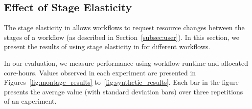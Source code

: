 \begin{figure*}[htbp]
	\centering
	\caption{\small Montage workflow performance (Cori):
	(a) workflow runtime  and (b) core-hours usage for Montage with and without \systemname. 
	Montage shows shorter runtimes without \systemname.
	For values of n larger than 32, \systemname runs consume less core-hours.
	}
	\label{fig:montage_results}
	\vspace{-0.4cm}
\end{figure*}
\subsection{Effect of Stage Elasticity}

The stage elasticity in \systemname allows workflows to
request resource changes between the stages of a workflow
(as described in Section~\ref{subsec:user}). In this section,
we present the results of using stage elasticity in \systemname
for different workflows. 

In our evaluation, we measure \systemname performance using workflow
runtime and allocated core-hours. Values observed in each experiment
are presented in Figures~\ref{fig:montage_results}
to~\ref{fig:synthetic_results}.  Each bar in the figure presents the
average value (with standard deviation bars) over three repetitions of an
experiment. 

